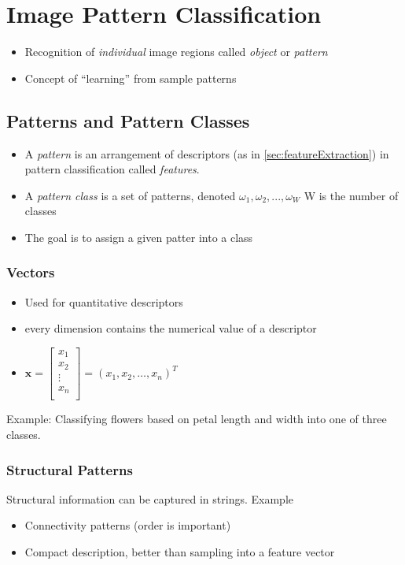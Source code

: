 \section{Image Pattern Classification}
\begin{itemize}
\item Recognition of \emph{individual} image regions called \emph{object} or \emph{pattern}
\item Concept of ``learning'' from sample patterns
\end{itemize}

\subsection{Patterns and Pattern Classes} %
\begin{itemize}
	\item A \emph{pattern} is an arrangement of descriptors
		(as in \ref{sec:featureExtraction}) in pattern classification
		called \emph{features}.
	\item A \emph{pattern class} is a set of patterns, denoted $\omega_1, \omega_2, ..., \omega_W$ W is the number of classes
	\item The goal is to assign a given patter into a class
\end{itemize}

\subsubsection{Vectors} %
\begin{itemize}
	\item Used for quantitative descriptors
	\item every dimension contains the numerical value of a descriptor
	\item $\mathbf{x} =
		\begin{bmatrix}
			x_1 \\
			x_2 \\
			\vdots \\
			x_n \\
		\end{bmatrix}
		 = (x_1, x_2, \ldots, x_n)^T $
\end{itemize}
Example: Classifying flowers based on petal length and width into one of three
classes.

\subsubsection{Structural Patterns} %
Structural information can be captured in strings. Example
\begin{itemize}
	\item Connectivity patterns (order is important)
	\item Compact description, better than sampling into a feature vector
\end{itemize}

